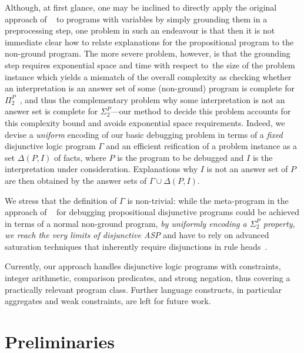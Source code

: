 \documentclass{tlp}
\newcommand{\meta}{\Gamma}
\newcommand{\reif}[1]{\Delta(#1)}
\newcommand{\wrt}{with respect to}
\begin{document}
Although, at first glance, one may be inclined to directly apply the original approach of ~\citeyear{gebser08}
to programs with variables by simply
grounding them in a preprocessing step, one problem in such an endeavour is that then it is not immediate clear how to 
relate explanations for the propositional program to the non-ground program. The more severe problem, however,
is that the grounding step requires exponential space and time \wrt\ the size of the problem instance which yields a mismatch of the overall complexity as
checking whether an interpretation is an answer set of some (non-ground) program is complete
for $\Pi^{P}_{2}$~\cite{eiter04}, and thus the complementary problem why some interpretation is not
an answer set is complete for $\Sigma^{P}_{2}$---our method to decide this problem accounts
for this complexity bound and avoids exponential space requirements.
Indeed, we devise a \emph{uniform} encoding of our basic debugging problem in terms of a \emph{fixed} disjunctive logic program $\meta$ and an efficient reification of 
a problem instance as a set $\reif{P,I}$ of facts, where $P$ is the program to be debugged and $I$ is the interpretation under consideration.
Explanations why $I$ is not an answer set of $P$ are then obtained by the answer sets of $\meta\cup \reif{P,I}$.

We stress that the definition of  $\meta$ is  non-trivial: while the meta-program in the approach of ~\citeyear{gebser08} for debugging propositional disjunctive programs
could be achieved in terms of a normal non-ground program, \emph{by uniformly encoding a $\Sigma^{P}_{2}$ property, we reach the very limits of disjunctive ASP} and have to rely on advanced saturation techniques that inherently require disjunctions in rule heads~\cite{eiter97}.

Currently, our approach handles disjunctive logic programs with  constraints,
integer arithmetic, comparison predicates, and strong negation, thus covering 
a practically relevant program class. Further language constructs, in particular
aggregates and weak constraints, are left for future work.


\section{Preliminaries}\label{sec:prel}
\end{document}

